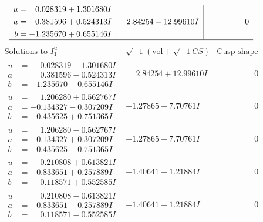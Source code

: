 \documentclass[1p]{elsarticle_modified}
\theoremstyle{definition}
\newcommand{\I}{\sqrt{-1}}
\begin{document}
$$\begin{array}{c|c|c}
\begin{aligned}
u &= \phantom{-}0.028319 + 1.301680 I \\
a &= \phantom{-}0.381596 + 0.524313 I \\
b &= -1.235670 + 0.655146 I\end{aligned}
 & \phantom{-}2.84254 - 12.99610 I & \phantom{-0.000000 } 0\\
 \hline 
 \end{array}$$\newpage$$\begin{array}{c|c|c}  
\text{Solutions to }I^u_{1}& \I (\text{vol} + \sqrt{-1}CS) & \text{Cusp shape}\\
 \hline 
\begin{aligned}
u &= \phantom{-}0.028319 - 1.301680 I \\
a &= \phantom{-}0.381596 - 0.524313 I \\
b &= -1.235670 - 0.655146 I\end{aligned}
 & \phantom{-}2.84254 + 12.99610 I & \phantom{-0.000000 } 0 \\ \hline\begin{aligned}
u &= \phantom{-}1.206280 + 0.562767 I \\
a &= -0.134327 - 0.307209 I \\
b &= -0.435625 + 0.751365 I\end{aligned}
 & -1.27865 + 7.70761 I & \phantom{-0.000000 } 0 \\ \hline\begin{aligned}
u &= \phantom{-}1.206280 - 0.562767 I \\
a &= -0.134327 + 0.307209 I \\
b &= -0.435625 - 0.751365 I\end{aligned}
 & -1.27865 - 7.70761 I & \phantom{-0.000000 } 0 \\ \hline\begin{aligned}
u &= \phantom{-}0.210808 + 0.613821 I \\
a &= -0.833651 + 0.257889 I \\
b &= \phantom{-}0.118571 + 0.552585 I\end{aligned}
 & -1.40641 - 1.21884 I & \phantom{-0.000000 } 0 \\ \hline\begin{aligned}
u &= \phantom{-}0.210808 - 0.613821 I \\
a &= -0.833651 - 0.257889 I \\
b &= \phantom{-}0.118571 - 0.552585 I\end{aligned}
 & -1.40641 + 1.21884 I & \phantom{-0.000000 } 0 \\ \hline\begin{aligned}

\end{aligned}
\end{array}$$
\end{document}

